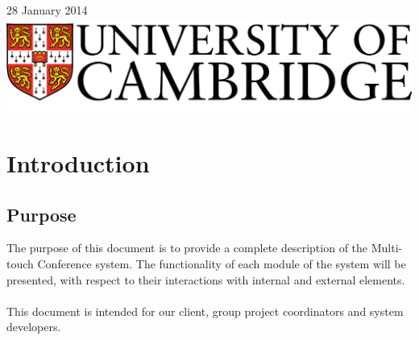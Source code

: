 \documentclass[12p, a4paper, onecolumn]{report}
\begin{document}
\begin{titlepage}

{\large 28 January 2014}\\[3cm] %


\includegraphics{logo.png}\\[1cm] %
 

\vfill %

\end{titlepage}

\setcounter{page}{1}

\tableofcontents

\newpage

\setcounter{page}{1}

\chapter{Introduction}

\section{Purpose}

The purpose of this document is to provide a complete description of the Multi-touch Conference system. The functionality of each module of the system will be presented, with respect to their interactions with internal and external elements. \\ \\
This document is intended for our client, group project coordinators and system developers.
\end{document}
